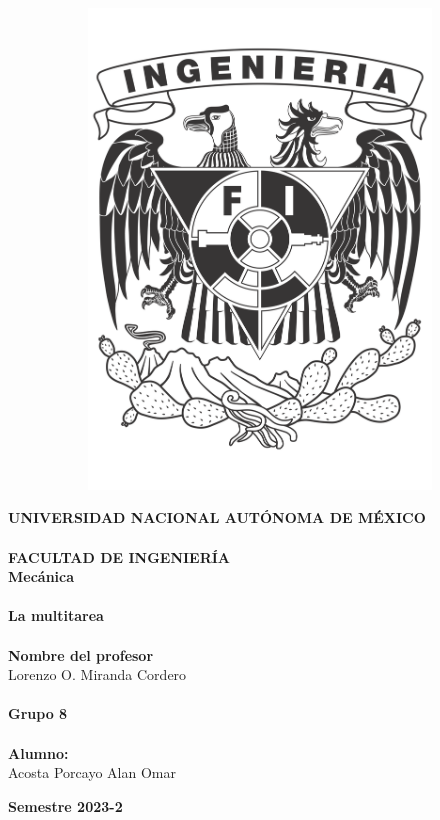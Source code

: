 \documentclass[12pt, titlepage]{article}
\begin{document}
\begin{titlepage}
\begin{figure}[ht]
\begin{subfigure}[l]{0.2\linewidth}
                \includegraphics[width=\textwidth]{Escudo_FI.png}
            \end{subfigure} 
        \end{figure}

        \large \textbf{UNIVERSIDAD NACIONAL AUTÓNOMA DE MÉXICO\\}
        \textbf{\\FACULTAD DE INGENIERÍA\\} 
        \hfill \break
        \Large\textbf{Mecánica\\}
        \textbf{\\La multitarea\\}
        \Large \textbf{\\Nombre del profesor\\}
        \large Lorenzo O. Miranda Cordero\\
        \Large \textbf{\\Grupo 8\\}
        \textbf{\\Alumno:\\}
        Acosta Porcayo Alan Omar\\

        \vspace{1cm}
        \begin{flushright}
            \Large \textbf{Semestre 2023-2}
        \end{flushright}
    \end{titlepage}
\end{document}
